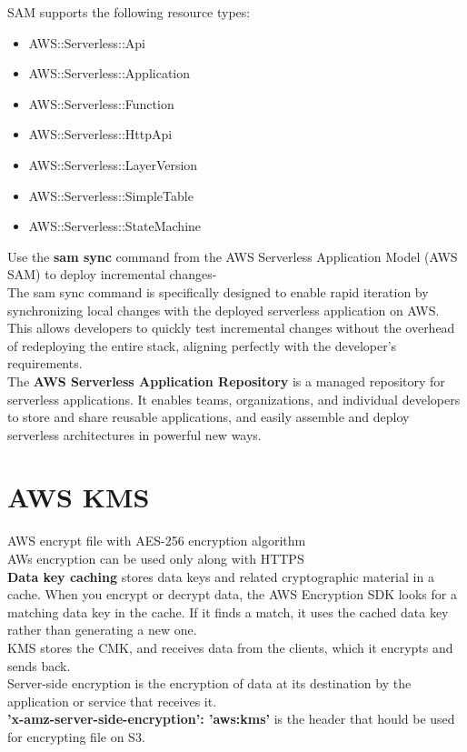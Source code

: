 \documentclass[12pt, letterpaper, twoside]{article}
\begin{document}
SAM supports the following resource types:
\begin{itemize}
	\item AWS::Serverless::Api
	\item AWS::Serverless::Application
	\item AWS::Serverless::Function
	\item AWS::Serverless::HttpApi
	\item AWS::Serverless::LayerVersion
	\item AWS::Serverless::SimpleTable
	\item AWS::Serverless::StateMachine
\end{itemize}

Use the \textbf{sam sync} command from the AWS Serverless Application Model (AWS SAM) to deploy incremental changes-\\
The sam sync command is specifically designed to enable rapid iteration by synchronizing local changes with the deployed 
serverless application on AWS. This allows developers to quickly test incremental changes without the overhead of 
redeploying the entire stack, aligning perfectly with the developer's requirements.\\

The \textbf{AWS Serverless Application Repository} is a managed repository for serverless applications. It enables teams, 
organizations, and individual developers to store and share reusable applications, and easily assemble and deploy serverless 
architectures in powerful new ways.\\

\section{AWS KMS}
AWS encrypt file with AES-256 encryption algorithm\\
AWs encryption can be used only along with HTTPS\\

\textbf{Data key caching} stores data keys and related cryptographic material in a cache. When you encrypt or decrypt data, 
the AWS Encryption SDK looks for a matching data key in the cache. If it finds a match, it uses the cached data key 
rather than generating a new one.\\

KMS stores the CMK, and receives data from the clients, which it encrypts and sends back.\\

Server-side encryption is the encryption of data at its destination by the application or service that receives it.\\
\textbf{'x-amz-server-side-encryption': 'aws:kms'} is the header that hould be used for encrypting file on S3.\\
\end{document}
